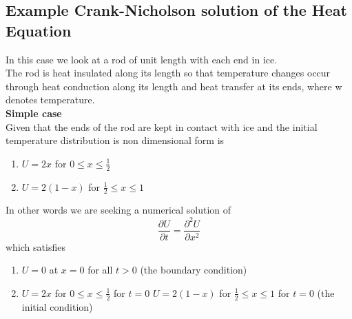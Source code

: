 \subsection{Example Crank-Nicholson solution of the Heat Equation} 
In this case we look at a rod of unit length with each end in ice.\\
The rod is heat insulated along its length so that temperature changes occur through
heat conduction along its length and heat transfer at its ends, where w denotes
temperature.\\
\textbf{Simple case}\\
Given that the ends of the rod are kept in contact with ice and the initial temperature
distribution is non dimensional form is
\begin{enumerate}
\item $U=2x$ for $0\leq x \leq \frac{1}{2}$ 
\item $U=2(1-x)$ for $\frac{1}{2}\leq x \leq 1$ 
\end{enumerate}
In other words we are seeking a numerical solution of
\[\frac{\partial U}{\partial t}=\frac{\partial^2U }{\partial x^2}\]
which satisfies
\begin{enumerate}
\item $U=0$ at $x=0$ for all $t>0$ (the boundary condition)
\item $U=2x$ for $0\leq x \leq \frac{1}{2}$ for $t=0$
$U=2(1-x)$ for $\frac{1}{2}\leq x \leq 1$ for $t=0$ (the initial condition)
\end{enumerate}
